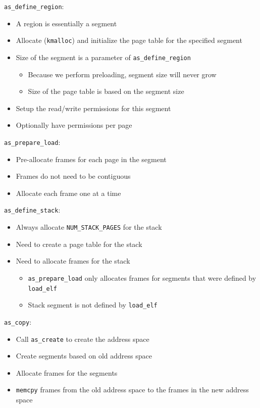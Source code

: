 \documentclass[12pt]{article}
\theoremstyle{plain}
\theoremstyle{definition}
\begin{document}
\texttt{as\_define\_region}:
\begin{itemize}
  \item A region is essentially a segment
  \item Allocate (\texttt{kmalloc}) and initialize the page table for the specified segment
  \item Size of the segment is a parameter of \texttt{as\_define\_region}
  \begin{itemize}
    \item Because we perform preloading, segment size will never grow
    \item Size of the page table is based on the segment size
  \end{itemize}
  \item Setup the read/write permissions for this segment
  \item Optionally have permissions per page
\end{itemize}

\texttt{as\_prepare\_load}:
\begin{itemize}
  \item Pre-allocate frames for each page in the segment
  \item Frames do not need to be contiguous
  \item Allocate each frame one at a time
\end{itemize}

\texttt{as\_define\_stack}:
\begin{itemize}
  \item Always allocate \texttt{NUM\_STACK\_PAGES} for the stack
  \item Need to create a page table for the stack
  \item Need to allocate frames for the stack
  \begin{itemize}
    \item \texttt{as\_prepare\_load} only allocates frames for segments that were defined by \texttt{load\_elf}
    \item Stack segment is not defined by \texttt{load\_elf}
  \end{itemize}
\end{itemize}

\texttt{as\_copy}:
\begin{itemize}
  \item Call \texttt{as\_create} to create the address space
  \item Create segments based on old address space
  \item Allocate frames for the segments
  \item \texttt{memcpy} frames from the old address space to the frames in the new address space
\end{itemize}
\end{document}
